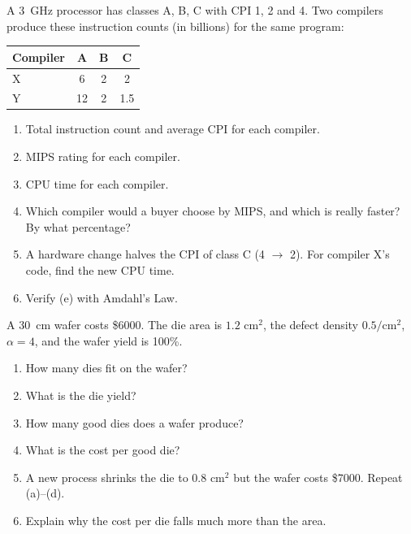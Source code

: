 \documentclass[11pt]{article}
\begin{document}
\begin{exercise}\label{x:compilers}
A 3~GHz processor has classes A, B, C with CPI 1, 2 and 4. Two compilers
produce these instruction counts (in billions) for the same program:
\begin{center}
\begin{tabular}{@{}lccc@{}}
\toprule
Compiler & A & B & C \\
\midrule
X & 6 & 2 & 2 \\
Y & 12 & 2 & 1.5 \\
\bottomrule
\end{tabular}
\end{center}
\begin{enumerate}[label=(\alph*),leftmargin=*]
  \item Total instruction count and average CPI for each compiler.
  \item MIPS rating for each compiler.
  \item CPU time for each compiler.
  \item Which compiler would a buyer choose by MIPS, and which is really
  faster? By what percentage?
  \item A hardware change halves the CPI of class C (4 $\to$ 2). For
  compiler X's code, find the new CPU time.
  \item Verify (e) with Amdahl's Law.
\end{enumerate}
\end{exercise}

\begin{exercise}\label{x:die}
A 30~cm wafer costs \$6000. The die area is $1.2\text{ cm}^2$, the defect
density $0.5/\text{cm}^2$, $\alpha = 4$, and the wafer yield is 100\%.
\begin{enumerate}[label=(\alph*),leftmargin=*]
  \item How many dies fit on the wafer?
  \item What is the die yield?
  \item How many good dies does a wafer produce?
  \item What is the cost per good die?
  \item A new process shrinks the die to $0.8\text{ cm}^2$ but the wafer costs
  \$7000. Repeat (a)--(d).
  \item Explain why the cost per die falls much more than the area.
\end{enumerate}
\end{exercise}

\end{document}
